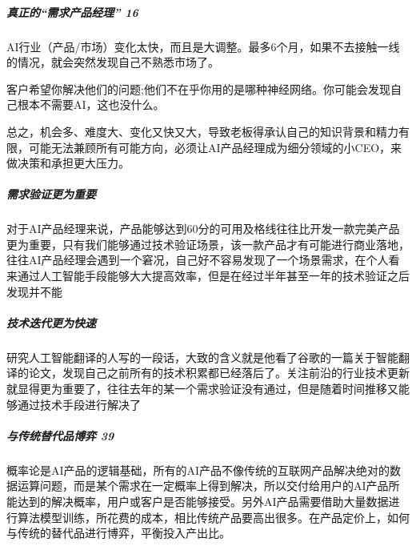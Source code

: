 \documentclass[letterpaper,10pt,english]{sphinxmanual}
\begin{document}
\subparagraph{真正的“需求产品经理” 16\sphinxfootnotemark[268]}
\label{\detokenize{chapter_introduction/AI_PM:id7}}%
\begin{footnotetext}[268]\sphinxAtStartFootnote
{}
%
\end{footnotetext}\ignorespaces 
AI行业（产品/市场）变化太快，而且是大调整。最多6个月，如果不去接触一线的情况，就会突然发现自己不熟悉市场了。

客户希望你解决他们的问题;他们不在乎你用的是哪种神经网络。你可能会发现自己根本不需要AI，这也没什么。

总之，机会多、难度大、变化又快又大，导致老板得承认自己的知识背景和精力有限，可能无法兼顾所有可能方向，必须让AI产品经理成为细分领域的小CEO，来做决策和承担更大压力。


\subparagraph{需求验证更为重要}
\label{\detokenize{chapter_introduction/AI_PM:id8}}
对于AI产品经理来说，产品能够达到60分的可用及格线往往比开发一款完美产品更为重要，只有我们能够通过技术验证场景，该一款产品才有可能进行商业落地，往往AI产品经理会遇到一个窘况，自己好不容易发现了一个场景需求，在个人看来通过人工智能手段能够大大提高效率，但是在经过半年甚至一年的技术验证之后发现并不能


\subparagraph{技术迭代更为快速}
\label{\detokenize{chapter_introduction/AI_PM:id9}}
研究人工智能翻译的人写的一段话，大致的含义就是他看了谷歌的一篇关于智能翻译的论文，发现自己之前所有的技术积累都已经落后了。关注前沿的行业技术更新就显得更为重要了，往往去年的某一个需求验证没有通过，但是随着时间推移又能够通过技术手段进行解决了


\subparagraph{与传统替代品博弈 39\sphinxfootnotemark[269]}
\label{\detokenize{chapter_introduction/AI_PM:id10}}%
\begin{footnotetext}[269]\sphinxAtStartFootnote
{}
%
\end{footnotetext}\ignorespaces 
概率论是AI产品的逻辑基础，所有的AI产品不像传统的互联网产品解决绝对的数据运算问题，而是某个需求在一定概率上得到解决，所以交付给用户的AI产品所能达到的解决概率，用户或客户是否能够接受。另外AI产品需要借助大量数据进行算法模型训练，所花费的成本，相比传统产品要高出很多。在产品定价上，如何与传统的替代品进行博弈，平衡投入产出比。
\end{document}
